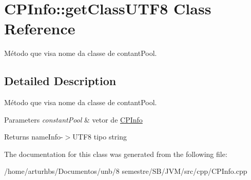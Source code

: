 \hypertarget{classCPInfo_1_1getClassUTF8}{}\section{C\+P\+Info\+:\+:get\+Class\+U\+T\+F8 Class Reference}
\label{classCPInfo_1_1getClassUTF8}


Método que visa nome da classe de contant\+Pool.  




\subsection{Detailed Description}
Método que visa nome da classe de contant\+Pool. 


\begin{DoxyParams}{Parameters}
{\em constant\+Pool} & vetor de \hyperlink{classCPInfo}{C\+P\+Info} \\
\hline
\end{DoxyParams}
\begin{DoxyReturn}{Returns}
name\+Info-\/$>$U\+T\+F8 tipo string 
\end{DoxyReturn}


The documentation for this class was generated from the following file\+:\begin{DoxyCompactItemize}
\item 
/home/arturhbs/\+Documentos/unb/8 semestre/\+S\+B/\+J\+V\+M/src/cpp/C\+P\+Info.\+cpp\end{DoxyCompactItemize}
